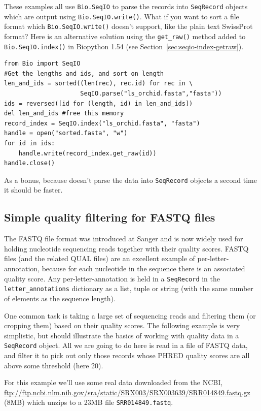 \documentclass{report}
\begin{document}
These examples all use \verb|Bio.SeqIO| to parse the records into
\verb|SeqRecord| objects which are output using \verb|Bio.SeqIO.write()|.
What if you want to sort a file format which \verb|Bio.SeqIO.write()| doesn't
support, like the plain text SwissProt format? Here is an alternative
solution using the \verb|get_raw()| method added to \verb|Bio.SeqIO.index()|
in Biopython 1.54 (see Section~\ref{sec:seqio-index-getraw}).

\begin{verbatim}
from Bio import SeqIO
#Get the lengths and ids, and sort on length         
len_and_ids = sorted((len(rec), rec.id) for rec in \
                     SeqIO.parse("ls_orchid.fasta","fasta"))
ids = reversed([id for (length, id) in len_and_ids])
del len_and_ids	#free this memory
record_index = SeqIO.index("ls_orchid.fasta", "fasta")
handle = open("sorted.fasta", "w")
for id in ids:
    handle.write(record_index.get_raw(id))
handle.close()
\end{verbatim}

As a bonus, because doesn't parse the data into \verb|SeqRecord| objects
a second time it should be faster.

\subsection{Simple quality filtering for FASTQ files}
\label{sec:FASTQ-filtering-example}

The FASTQ file format was introduced at Sanger and is now widely used for
holding nucleotide sequencing reads together with their quality scores.
FASTQ files (and the related QUAL files) are an excellent example of
per-letter-annotation, because for each nucleotide in the sequence there is
an associated quality score.  Any per-letter-annotation is held in a
\verb|SeqRecord| in the \verb|letter_annotations| dictionary as a list,
tuple or string (with the same number of elements as the sequence length).

One common task is taking a large set of sequencing reads and filtering them
(or cropping them) based on their quality scores.
The following example is very simplistic, but should illustrate the basics of
working with quality data in a \verb|SeqRecord| object.  All we are going to
do here is read in a file of FASTQ data, and filter it to pick out only those
records whose PHRED quality scores are all above some threshold (here 20).

For this example we'll use some real data downloaded from the NCBI,
\url{ftp://ftp.ncbi.nlm.nih.gov/sra/static/SRX003/SRX003639/SRR014849.fastq.gz}
(8MB) which unzips to a 23MB file \texttt{SRR014849.fastq}.
\end{document}
